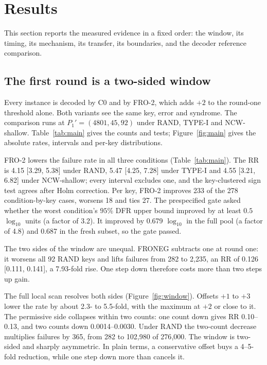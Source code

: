 \section{Results}\label{sec:results}

This section reports the measured evidence in a fixed order: the window, its timing, its mechanism, its transfer, its boundaries, and the decoder reference comparison.

\subsection{The first round is a two-sided window}\label{sec:formal}

Every instance is decoded by C0 and by FRO-2, which adds $+2$ to the round-one threshold alone. Both variants see the same key, error and syndrome. The comparison runs at $P_1'=(4801,45,92)$ under RAND, TYPE-I and NCW-shallow. Table~\ref{tab:main} gives the counts and tests; Figure~\ref{fig:main} gives the absolute rates, intervals and per-key distributions.

FRO-2 lowers the failure rate in all three conditions (Table~\ref{tab:main}). The RR is 4.15 [3.29, 5.38] under RAND, 5.47 [4.25, 7.28] under TYPE-I and 4.55 [3.21, 6.82] under NCW-shallow; every interval excludes one, and the key-clustered sign test agrees after Holm correction. Per key, FRO-2 improves 233 of the 278 condition-by-key cases, worsens 18 and ties 27. The prespecified gate asked whether the worst condition's $95\%$ DFR upper bound improved by at least $0.5$ $\log_{10}$ units (a factor of 3.2). It improved by 0.679 $\log_{10}$ in the full pool (a factor of 4.8) and 0.687 in the fresh subset, so the gate passed.

The two sides of the window are unequal. FRONEG subtracts one at round one: it worsens all 92 RAND keys and lifts failures from 282 to 2{,}235, an RR of 0.126 [0.111, 0.141], a 7.93-fold rise. One step down therefore costs more than two steps up gain.

The full local scan resolves both sides (Figure~\ref{fig:window}). Offsets $+1$ to $+3$ lower the rate by about 2.3- to 5.5-fold, with the maximum at $+2$ or close to it. The permissive side collapses within two counts: one count down gives RR 0.10--0.13, and two counts down 0.0014--0.0030. Under RAND the two-count decrease multiplies failures by 365, from 282 to 102{,}980 of 276{,}000. The window is two-sided and sharply asymmetric. In plain terms, a conservative offset buys a 4--5-fold reduction, while one step down more than cancels it.

